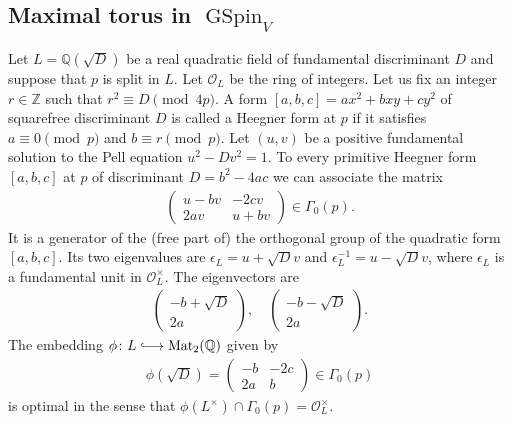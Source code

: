 \documentclass[11pt]{article} %
\newcommand{\8}{\infty}
\newcommand{\Z}{\mathbb{Z}}
\newcommand{\GSpin}{\operatorname{GSpin}}
\newcommand{\Q}{\mathbb{Q}}
\newcommand{\Ocal}{\mathcal{O}}
\newcommand{\Mat}{\operatorname{Mat}}
\newcommand{\hooklongrightarrow}{\lhook\joinrel\longrightarrow}
\theoremstyle{mytheoremstyle}
\theoremstyle{remark}
\numberwithin{equation}{section}
\begin{document}
\subsection{Maximal torus in $\GSpin_V$}
Let $L=\Q(\sqrt{D})$ be a real quadratic field of fundamental discriminant $D$ and suppose that $p$ is split in $L$. Let $\Ocal_L$ be the ring of integers. Let us fix an integer $r \in \Z$ such that $r^2 \equiv D \pmod{4p}$. A form $[a,b,c]=ax^2+bxy+cy^2$ of squarefree discriminant $D$ is called a Heegner form at $p$ if it satisfies $a \equiv 0 \pmod{p}$ and $b \equiv r \pmod{p}$. Let $(u,v)$ be a positive fundamental solution to the Pell equation $u^2-Dv^2=1$. To every primitive Heegner form $[a,b,c]$ at $p$ of discriminant $D=b^2-4ac$ we can associate the matrix
\begin{align}
    \begin{pmatrix}
        u-bv & -2cv \\ 2av & u+bv
    \end{pmatrix} \in \Gamma_0(p).
\end{align}
It is a generator of the (free part of) the orthogonal group of the quadratic form $[a,b,c]$. Its two eigenvalues are $\epsilon_L=u+\sqrt{D}v$ and $\epsilon_L^{-1}=u-\sqrt{D}v$, where $\epsilon_L$ is a fundamental unit in $\Ocal^\times_L$. The eigenvectors are
\begin{align}
    \begin{pmatrix}
        -b + \sqrt{D} \\ 2a
    \end{pmatrix}, \quad \begin{pmatrix}
        -b - \sqrt{D} \\ 2a
    \end{pmatrix}.
\end{align}
The embedding $\phi \colon L \hooklongrightarrow \Mat_2(\Q)$ given by 
\begin{align}
    \phi(\sqrt{D}) = \begin{pmatrix}
        -b & -2c \\ 2a & b
    \end{pmatrix}\in \Gamma_0(p)
\end{align}
is optimal in the sense that $\phi(L^\times) \cap \Gamma_0(p)=\Ocal_L^\times.$
\end{document}
